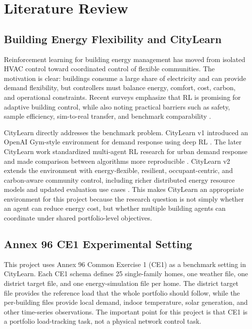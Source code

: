 ﻿\chapter{Literature Review}\label{ch:background}

\section{Building Energy Flexibility and CityLearn}

Reinforcement learning for building energy management has moved from isolated
HVAC control toward coordinated control of flexible communities. The motivation
is clear: buildings consume a large share of electricity and can provide demand
flexibility, but controllers must balance energy, comfort, cost, carbon, and
operational constraints. Recent surveys emphasize that RL is promising for
adaptive building control, while also noting practical barriers such as safety,
sample efficiency, sim-to-real transfer, and benchmark comparability
\cite{zandi2023tenquestions,safeDRL2025}.

CityLearn directly addresses the benchmark problem. CityLearn v1 introduced an
OpenAI Gym-style environment for demand response using deep RL
\cite{citylearn2019}. The later CityLearn work standardized multi-agent RL
research for urban demand response and made comparison between algorithms more
reproducible \cite{citylearn2020}. CityLearn v2 extends the environment with
energy-flexible, resilient, occupant-centric, and carbon-aware community
control, including richer distributed energy resource models and updated
evaluation use cases \cite{citylearnv2}. This makes CityLearn an appropriate
environment for this project because the research question is not simply
whether an agent can reduce energy cost, but whether multiple building agents
can coordinate under shared portfolio-level objectives.

\section{Annex 96 CE1 Experimental Setting}

This project uses Annex 96 Common Exercise 1 (CE1) as a benchmark setting in
CityLearn. Each CE1 schema defines 25 single-family homes, one weather file, one
district target file, and one energy-simulation file per home. The district
target file provides the reference load that the whole portfolio should follow,
while the per-building files provide local demand, indoor temperature, solar
generation, and other time-series observations. The important point for this
project is that CE1 is a portfolio load-tracking task, not a physical network
control task.

